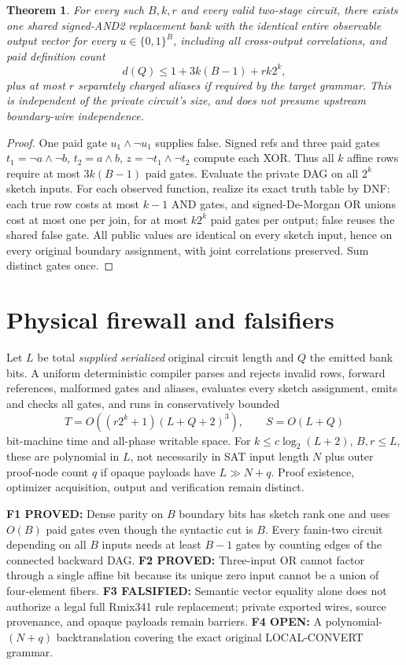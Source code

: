 \documentclass{article}
\newtheorem{theorem}{Theorem}
\begin{document}
\begin{theorem}
For every such $B,k,r$ and every valid two-stage circuit, there exists one shared signed-AND2 replacement bank with the identical entire observable output vector for every $u\in\{0,1\}^{B}$, including all cross-output correlations, and paid definition count
\[
d(Q)\le1+3k(B-1)+rk2^k,
\]
plus at most $r$ separately charged aliases if required by the target grammar. This is independent of the private circuit's size, and does not presume upstream boundary-wire independence.
\end{theorem}
\begin{proof}
One paid gate $u_1\wedge\neg u_1$ supplies false. Signed refs and three paid gates $t_1=\neg a\wedge\neg b$, $t_2=a\wedge b$, $z=\neg t_1\wedge\neg t_2$ compute each XOR. Thus all $k$ affine rows require at most $3k(B-1)$ paid gates. Evaluate the private DAG on all $2^k$ sketch inputs. For each observed function, realize its exact truth table by DNF: each true row costs at most $k-1$ AND gates, and signed-De-Morgan OR unions cost at most one per join, for at most $k2^k$ paid gates per output; false reuses the shared false gate. All public values are identical on every sketch input, hence on every original boundary assignment, with joint correlations preserved. Sum distinct gates once.
\end{proof}

\section*{Physical firewall and falsifiers}
Let $L$ be total \emph{supplied serialized} original circuit length and $Q$ the emitted bank bits. A uniform deterministic compiler parses and rejects invalid rows, forward references, malformed gates and aliases, evaluates every sketch assignment, emits and checks all gates, and runs in conservatively bounded
\[
T=O((r2^k+1)(L+Q+2)^3),\qquad S=O(L+Q)
\]
bit-machine time and all-phase writable space. For $k\le c\log_2(L+2)$, $B,r\le L$, these are polynomial in $L$, not necessarily in SAT input length $N$ plus outer proof-node count $q$ if opaque payloads have $L\gg N+q$. Proof existence, optimizer acquisition, output and verification remain distinct.

\noindent\textbf{F1 PROVED:} Dense parity on $B$ boundary bits has sketch rank one and uses $O(B)$ paid gates even though the syntactic cut is $B$. Every fanin-two circuit depending on all $B$ inputs needs at least $B-1$ gates by counting edges of the connected backward DAG. \textbf{F2 PROVED:} Three-input OR cannot factor through a single affine bit because its unique zero input cannot be a union of four-element fibers. \textbf{F3 FALSIFIED:} Semantic vector equality alone does not authorize a legal full Rmix341 rule replacement; private exported wires, source provenance, and opaque payloads remain barriers. \textbf{F4 OPEN:} A polynomial-$(N+q)$ backtranslation covering the exact original LOCAL-CONVERT grammar.
\end{document}
